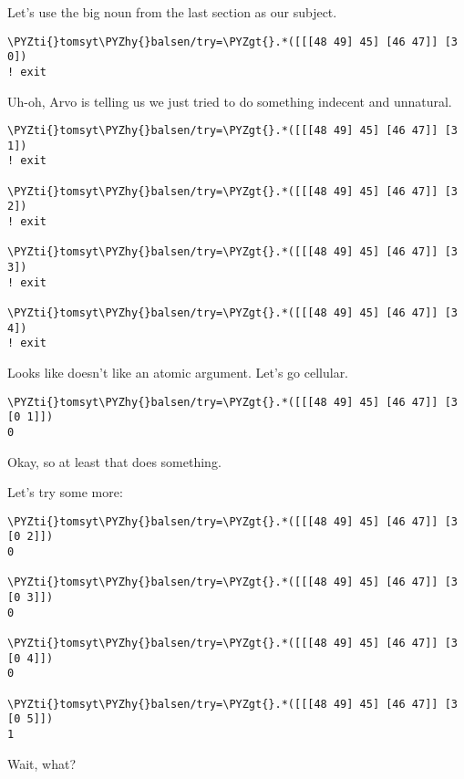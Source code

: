 Let's use the big noun \kode{[[[48 49] 45] [46 47]]} from the last section as our subject. 
\begin{framed_shaded}
\begin{Verbatim}[fontsize=\relsize{-2.5},fontseries=b,commandchars=\\\{\}]
\PYZti{}tomsyt\PYZhy{}balsen/try=\PYZgt{}.*([[[48 49] 45] [46 47]] [3 0])
! exit
\end{Verbatim}
\end{framed_shaded}
Uh-oh, Arvo is telling us we just tried to do something indecent and unnatural. 
\begin{framed_shaded}
\begin{Verbatim}[fontsize=\relsize{-2.5},fontseries=b,commandchars=\\\{\}]
\PYZti{}tomsyt\PYZhy{}balsen/try=\PYZgt{}.*([[[48 49] 45] [46 47]] [3 1])
! exit

\PYZti{}tomsyt\PYZhy{}balsen/try=\PYZgt{}.*([[[48 49] 45] [46 47]] [3 2])
! exit

\PYZti{}tomsyt\PYZhy{}balsen/try=\PYZgt{}.*([[[48 49] 45] [46 47]] [3 3])
! exit

\PYZti{}tomsyt\PYZhy{}balsen/try=\PYZgt{}.*([[[48 49] 45] [46 47]] [3 4])
! exit
\end{Verbatim}
\end{framed_shaded}
Looks like  doesn't like an atomic argument. Let's go cellular.
\begin{framed_shaded}
\begin{Verbatim}[fontsize=\relsize{-2.5},fontseries=b,commandchars=\\\{\}]
\PYZti{}tomsyt\PYZhy{}balsen/try=\PYZgt{}.*([[[48 49] 45] [46 47]] [3 [0 1]])
0
\end{Verbatim}
\end{framed_shaded}
Okay, so at least that does something.

Let's try some more:
\begin{framed_shaded}
\begin{Verbatim}[fontsize=\relsize{-2.5},fontseries=b,commandchars=\\\{\}]
\PYZti{}tomsyt\PYZhy{}balsen/try=\PYZgt{}.*([[[48 49] 45] [46 47]] [3 [0 2]])
0

\PYZti{}tomsyt\PYZhy{}balsen/try=\PYZgt{}.*([[[48 49] 45] [46 47]] [3 [0 3]])
0

\PYZti{}tomsyt\PYZhy{}balsen/try=\PYZgt{}.*([[[48 49] 45] [46 47]] [3 [0 4]])
0

\PYZti{}tomsyt\PYZhy{}balsen/try=\PYZgt{}.*([[[48 49] 45] [46 47]] [3 [0 5]])
1
\end{Verbatim}
\end{framed_shaded}
Wait, what?

